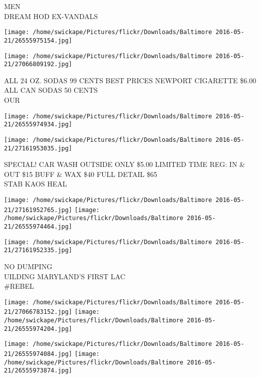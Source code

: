 \documentclass[10pt,letterpaper]{article}
\begin{document}
MEN\\
DREAM HOD EX{-}VANDALS\\
\pagebreak

\texttt{[image: /home/swickape/Pictures/flickr/Downloads/Baltimore 2016-05-21/26555975154.jpg]}

\vspace{0.25in}
\texttt{[image: /home/swickape/Pictures/flickr/Downloads/Baltimore 2016-05-21/27066809192.jpg]}

ALL 24 OZ. SODAS 99 CENTS BEST PRICES NEWPORT CIGARETTE \$6.00 ALL CAN SODAS 50 CENTS\\
OUR\\
\pagebreak

\texttt{[image: /home/swickape/Pictures/flickr/Downloads/Baltimore 2016-05-21/26555974934.jpg]}

\vspace{0.25in}
\texttt{[image: /home/swickape/Pictures/flickr/Downloads/Baltimore 2016-05-21/27161953035.jpg]}

SPECIAL!  CAR WASH OUTSIDE ONLY \$5.00 LIMITED TIME REG: IN \& OUT \$15 BUFF \& WAX \$40 FULL DETAIL \$65\\
STAB KAOS HEAL\\
\pagebreak

\texttt{[image: /home/swickape/Pictures/flickr/Downloads/Baltimore 2016-05-21/27161952765.jpg]}
\texttt{[image: /home/swickape/Pictures/flickr/Downloads/Baltimore 2016-05-21/26555974464.jpg]}

\vspace{0.25in}
\texttt{[image: /home/swickape/Pictures/flickr/Downloads/Baltimore 2016-05-21/27161952335.jpg]}

NO DUMPING\\
UILDING MARYLAND'S FIRST LAC\\
\#REBEL\\
\pagebreak

\texttt{[image: /home/swickape/Pictures/flickr/Downloads/Baltimore 2016-05-21/27066783152.jpg]}
\texttt{[image: /home/swickape/Pictures/flickr/Downloads/Baltimore 2016-05-21/26555974204.jpg]}

\texttt{[image: /home/swickape/Pictures/flickr/Downloads/Baltimore 2016-05-21/26555974084.jpg]}
\texttt{[image: /home/swickape/Pictures/flickr/Downloads/Baltimore 2016-05-21/26555973874.jpg]}
\end{document}
